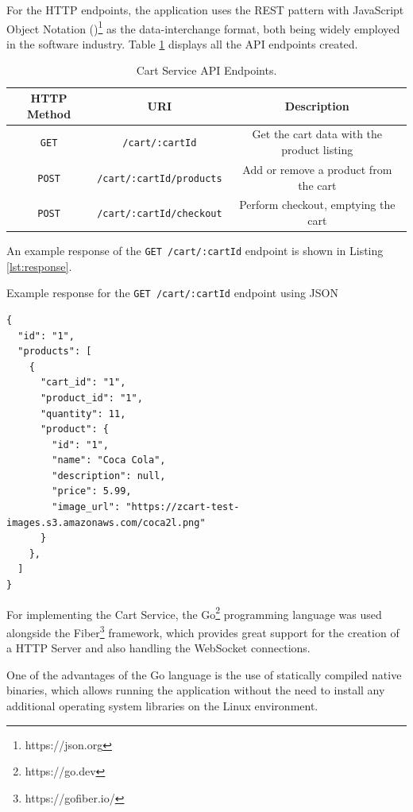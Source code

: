 For the HTTP endpoints, the application uses the REST \cite{Roy2000} pattern
with JavaScript Object Notation ()\footnote{https://json.org} as the data-interchange format, both
being widely employed in the software industry. Table \ref{tab:cartendpoints} displays all the API
endpoints created.

\begin{table}[H]
	\centering
    \caption[Cart Service API endpoints]{Cart Service API Endpoints.}
	\begin{tabular}{c | c|c}
		\hline 
        HTTP Method & URI & Description \\
		\hline
        \texttt{GET} & \texttt{/cart/:cartId} & Get the cart data with the product listing \\
        \texttt{POST} & \texttt{/cart/:cartId/products} & Add or remove a product from the cart \\
        \texttt{POST} & \texttt{/cart/:cartId/checkout} & Perform checkout, emptying the cart \\
		\hline 
	\end{tabular}
	\fonte{}
    \label{tab:cartendpoints}
\end{table}

An example response of the \texttt{GET /cart/:cartId} endpoint is shown in
Listing \ref{lst:response}.

\begin{sourcecode}
\caption{Example response for the \texttt{GET /cart/:cartId} endpoint using JSON}
\begin{lstlisting}[label={lst:response}]
{
  "id": "1",
  "products": [
    {
      "cart_id": "1",
      "product_id": "1",
      "quantity": 11,
      "product": {
        "id": "1",
        "name": "Coca Cola",
        "description": null,
        "price": 5.99,
        "image_url": "https://zcart-test-images.s3.amazonaws.com/coca2l.png"
      }
    },
  ]
}
\end{lstlisting}
\fonte{}
\end{sourcecode}

For implementing the Cart Service, the Go\footnote{https://go.dev} programming
language was used alongside the Fiber\footnote{https://gofiber.io/} framework,
which provides great support for the creation of a HTTP Server and also
handling the WebSocket connections.

One of the advantages of the Go language is the use of statically compiled
native binaries, which allows running the application without the need to
install any additional operating system libraries on the Linux environment. 

